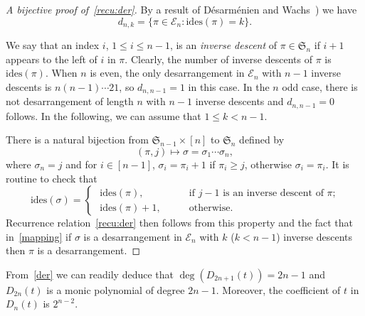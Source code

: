 \documentclass[12pt]{amsart}
\numberwithin{equation}{section}
\theoremstyle{plain}
\theoremstyle{definition}
\def\des{\mathrm{des}}
\def\S{\mathfrak{S}}
\def\D{\mathfrak{D}}
\def\E{\mathcal{E}}
\def\ides{\mathrm{ides}}
\begin{document}
 \begin{proof}[A bijective proof of~\eqref{recu:der}] 
 By a result of D\'esarm\'enien and Wachs~\cite[Corollary~3.3]{dw}) 
we have 
 $$
 d_{n,k}=\{\pi\in\E_n:\ides(\pi)=k\}.
 $$

 
We say that an index $i$, $1\leq i\leq n-1$, is an {\em inverse descent} of $\pi\in\S_n$ if $i+1$ appears to the left of $i$ in $\pi$. Clearly, the number of inverse descents of $\pi$ is $\ides(\pi)$. When $n$ is even, the only desarrangement in $\E_n$ with $n-1$ inverse descents is $n(n-1)\cdots 21$, so $d_{n,n-1}=1$ in this case. In the $n$ odd case, there is not desarrangement of length $n$ with $n-1$ inverse descents and $d_{n,n-1}=0$ follows. In the following, we can assume that $1\leq k<n-1$.

There is a natural bijection  from $\S_{n-1}\times[n]$ to $\S_n$ defined by 
\begin{equation}\label{mapping}
(\pi,j)\mapsto\sigma=\sigma_1\cdots\sigma_n, 
\end{equation}
where $\sigma_n=j$ and for $ i\in[n-1]$, $\sigma_i=\pi_i+1$ if $\pi_i\geq j$, otherwise $\sigma_i=\pi_i$.
It is routine to check that 
$$
\ides(\sigma)=
\begin{cases}
\,\,\ides(\pi),\qquad&\text{if $j-1$ is an inverse descent of $\pi$;}\\
\,\,\ides(\pi)+1,\qquad&\text{otherwise}.
\end{cases}
$$
Recurrence relation~\eqref{recu:der} then follows from this property and the fact that in~\eqref{mapping} if $\sigma$ is a desarrangement in $\E_n$ with $k$ ($k<n-1$) inverse descents then $\pi$ is a desarrangement.
 \end{proof}
 
 From~\eqref{der} we can readily deduce that $\deg(D_{2n+1}(t))=2n-1$ and $D_{2n}(t)$ is a monic polynomial of degree $2n-1$. Moreover, the coefficient of $t$ in $D_n(t)$ is $2^{n-2}$.
  
\end{document}
